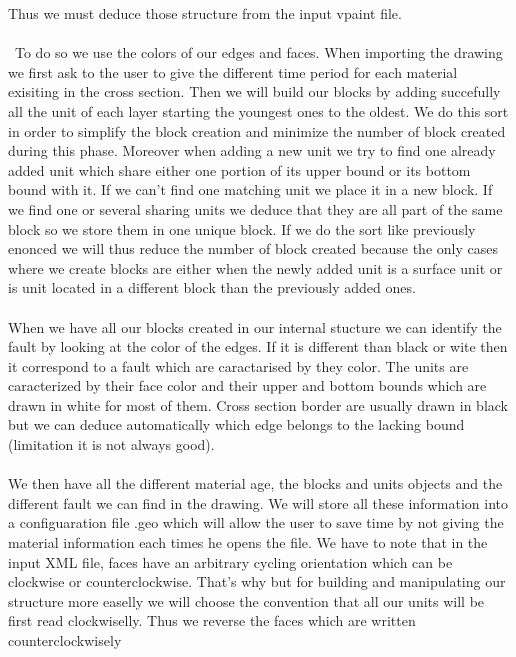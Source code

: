 \documentclass[12pt, a4paper]{report} %
\begin{document}
Thus we must deduce those structure from the input vpaint file. \\\\\
To do so we use the colors of our edges and faces. When importing the drawing we first ask to the user to give the different time period for each material exisiting in the cross section. Then we will build our blocks by adding succefully all the unit of each layer starting the youngest ones to the oldest. We do this sort in order to simplify the block creation and minimize the number of block created during this phase. Moreover when adding a new unit we try to find one already added unit which share either one portion of its upper bound  or its bottom bound with it. If we can't find one matching unit we place it in a new block. If we find one or several sharing units we deduce that they are all part of the same block so we store them in one unique block. If we do the sort like previously enonced we will thus reduce the number of block created because the only cases where we create blocks are either when the newly added unit is a surface unit or is unit located in a different block than the previously added ones.\\\\

When we have all our blocks created in our internal stucture we can identify the fault by looking at the color of the edges. If it is different than black or wite then it correspond to a fault which are caractarised by they color. The units are caracterized by their face color and their upper and bottom bounds which are drawn in white for most of them. Cross section border are usually drawn in black but we can deduce automatically which edge belongs to the lacking bound (limitation it is not always good).\\\\

We then have all the different material age, the blocks and units objects and the different fault we can find in the drawing. We will store all these information into a configuaration file .geo which will allow the user to save time by not giving the material information each times he opens the file. We have to note that in the input XML file, faces have an arbitrary cycling orientation which can be clockwise or counterclockwise. That's why but for building and manipulating our structure more easelly we will choose the convention that all our units will be first read clockwiselly. Thus we reverse the faces which are written counterclockwisely\\\\
 
\end{document}
